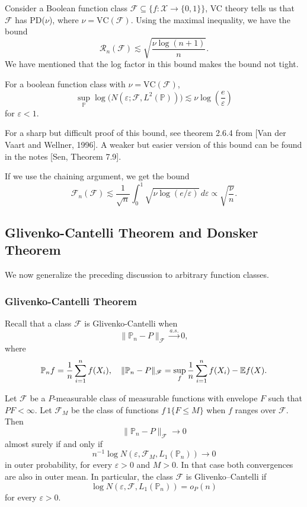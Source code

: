 \begin{exam}
    Consider a Boolean function class $\mathcal{F} \subseteq \{f : \mathcal{X} \to \{0,1\}\}$, VC theory tells us that $\mathcal{F}$ has PD($\nu$), where $\nu = \mathrm{VC}(\mathcal{F})$. Using the maximal inequality, we have the bound
\[
    \mathcal{R}_n(\mathcal{F}) \lesssim \sqrt{\frac{\nu \log(n+1)}{n}}.
\]
We have mentioned that the log factor in this bound makes the bound not tight.

\begin{prop}
For a boolean function class with $\nu = \mathrm{VC}(\mathcal{F})$,
\[
    \sup_{\mathbb{P}} \log\bigl(N(\varepsilon; \mathcal{F}, L^2(\mathbb{P}))\bigr) \lesssim \nu \log\left(\frac{e}{\varepsilon}\right)
\]
for $\varepsilon < 1$.
\end{prop}

For a sharp but difficult proof of this bound, see theorem 2.6.4 from [Van der Vaart and Wellner, 1996]. A weaker but easier version of this bound can be found in the notes [Sen, Theorem 7.9].

If we use the chaining argument, we get the bound
\[
    \mathcal{F}_n(\mathcal{F}) \lesssim \frac{1}{\sqrt{n}} \int_0^1 \sqrt{\nu \log(e/\varepsilon)} \, d\varepsilon \propto \sqrt{\frac{\nu}{n}}.
\]
\end{exam}

\subsection{Glivenko-Cantelli Theorem and Donsker Theorem}
We now generalize the preceding discussion to arbitrary function classes.
\subsubsection{Glivenko-Cantelli Theorem}
Recall that a class $\mathcal{F}$ is Glivenko-Cantelli when
$$\|{\mathbb{P}_n-P}\|_{\mathcal{F}}\xrightarrow{a.s.}0,
$$
where
\[
\mathbb{P}_nf = \frac 1 n \sum_{i=1}^n f(X_i), \quad \|{\mathbb{P}_n-P}\|_{\mathcal{F}} = \sup_f \frac 1 n \sum_{i=1}^nf(X_i) -\mathbb{E} f(X).
\]

\begin{thm}
Let \(\mathcal F\) be a \(P\)-measurable class of measurable functions with envelope \(F\) such that \(PF<\infty\). Let \(\mathcal F_M\) be the class of functions \(f\,1\{F\le M\}\) when \(f\) ranges over \(\mathcal F\). Then
\[
\|\mathbb P_n-P\|_{\mathcal F}\to 0
\]
almost surely if and only if
\[
n^{-1}\log N(\varepsilon,\mathcal F_M,L_1(\mathbb P_n))\to 0
\]
in outer probability, for every \(\varepsilon>0\) and \(M>0\). In that case both convergences are also in outer mean. In particular, the class \(\mathcal F\) is Glivenko--Cantelli if
\[
\log N(\varepsilon,\mathcal F,L_1(\mathbb P_n))=o_P(n)
\]
for every \(\varepsilon>0\).
\end{thm}

